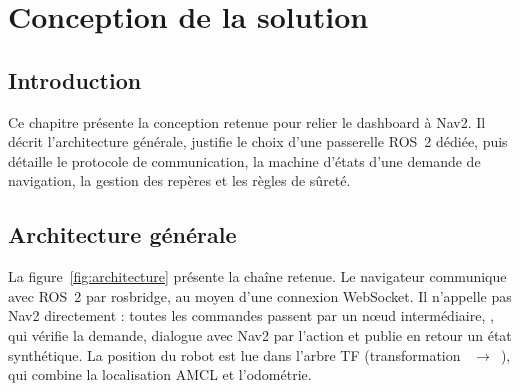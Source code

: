\chapter{Conception de la solution}
\label{chap:conception}

\section*{Introduction}
Ce chapitre présente la conception retenue pour relier le dashboard à Nav2. Il décrit
l'architecture générale, justifie le choix d'une passerelle ROS~2 dédiée, puis détaille le
protocole de communication, la machine d'états d'une demande de navigation, la gestion
des repères et les règles de sûreté.

\section{Architecture générale}
La figure~\ref{fig:architecture} présente la chaîne retenue. Le navigateur communique avec
ROS~2 par rosbridge, au moyen d'une connexion WebSocket. Il n'appelle pas Nav2
directement : toutes les commandes passent par un nœud intermédiaire,
, qui vérifie la demande, dialogue avec Nav2 par l'action
 et publie en retour un état synthétique. La position du robot
est lue dans l'arbre TF (transformation ~$\rightarrow$~), qui
combine la localisation AMCL et l'odométrie.

